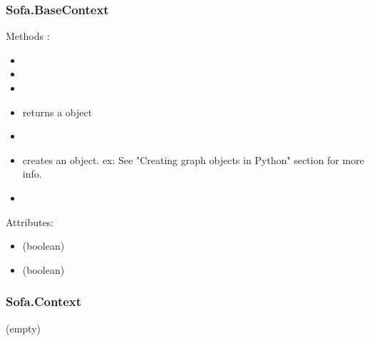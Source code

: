 \subsubsection{Sofa.BaseContext}
Methods :
\begin{itemize}
\item {} 
\item {} 
\item {} 
\item {} returns a  object
\item {} 
\item {} creates an object. ex:  See "Creating graph objects in Python" section for more info.
\item {}
\end{itemize}
Attributes:
\begin{itemize}
\item {}  (boolean)
\item {}  (boolean)
\end{itemize}


\subsubsection{Sofa.Context}
(empty)
